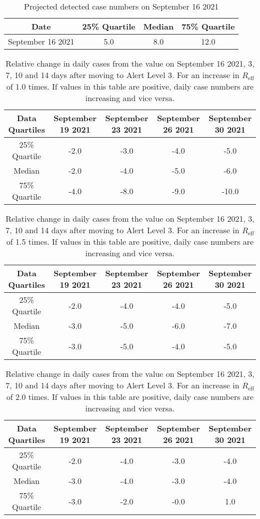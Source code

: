 
\begin{table}[h] 
 \centering 
 \begin{tabular}{c|c|c|c}
Date & 25\% Quartile & Median & 75\% Quartile \\
\hline
September 16 2021 & 5.0 & 8.0 & 12.0\\
\end{tabular}
\caption{Projected detected case numbers on September 16 2021}
\label{tab:BP_predicted_cases}
\end{table}

\begin{table}[h] 
 \centering 
 \begin{tabular}{c|c|c|c|c}
Data Quartiles & September 19 2021 & September 23 2021 & September 26 2021 & September 30 2021\\
\hline
25\% Quartile & -2.0 & -3.0 & -4.0 & -5.0\\
Median & -2.0 & -4.0 & -5.0 & -6.0\\
75\% Quartile & -4.0 & -8.0 & -9.0 & -10.0\\
\end{tabular}
\caption{Relative change in daily cases from the value on September 16 2021, 3, 7, 10 and 14 days after moving to Alert Level 3. For an increase in $R_\text{eff}$ of 1.0 times. If values in this table are positive, daily case numbers are increasing and vice versa.}
\label{tab:BP_predicted_cases_1.0}
\end{table}
\begin{table}[h] 
 \centering 
 \begin{tabular}{c|c|c|c|c}
Data Quartiles & September 19 2021 & September 23 2021 & September 26 2021 & September 30 2021\\
\hline
25\% Quartile & -2.0 & -4.0 & -4.0 & -5.0\\
Median & -3.0 & -5.0 & -6.0 & -7.0\\
75\% Quartile & -3.0 & -5.0 & -4.0 & -5.0\\
\end{tabular}
\caption{Relative change in daily cases from the value on September 16 2021, 3, 7, 10 and 14 days after moving to Alert Level 3. For an increase in $R_\text{eff}$ of 1.5 times. If values in this table are positive, daily case numbers are increasing and vice versa.}
\label{tab:BP_predicted_cases_1.5}
\end{table}
\begin{table}[h] 
 \centering 
 \begin{tabular}{c|c|c|c|c}
Data Quartiles & September 19 2021 & September 23 2021 & September 26 2021 & September 30 2021\\
\hline
25\% Quartile & -2.0 & -4.0 & -3.0 & -4.0\\
Median & -3.0 & -4.0 & -3.0 & -4.0\\
75\% Quartile & -3.0 & -2.0 & -0.0 & 1.0\\
\end{tabular}
\caption{Relative change in daily cases from the value on September 16 2021, 3, 7, 10 and 14 days after moving to Alert Level 3. For an increase in $R_\text{eff}$ of 2.0 times. If values in this table are positive, daily case numbers are increasing and vice versa.}
\label{tab:BP_predicted_cases_2.0}
\end{table}
